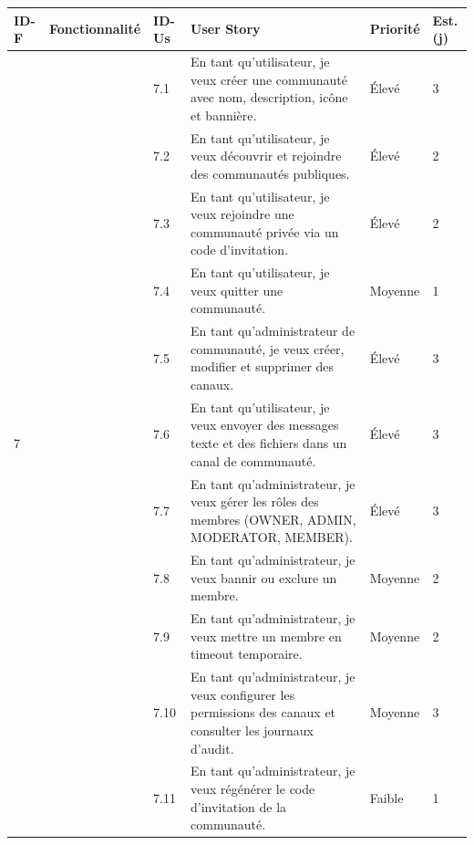 \documentclass[12pt,a4paper]{report}
\begin{document}
\begin{center}
\renewcommand{\arraystretch}{1.4}
\begin{longtable}{|p{1cm}|p{3.2cm}|p{1.2cm}|p{7.2cm}|p{1.8cm}|p{1.8cm}|}
\hline
{}
\color{white}\textbf{ID-F} & \color{white}\textbf{Fonctionnalité} & \color{white}\textbf{ID-Us} & \color{white}\textbf{User Story} & \color{white}\textbf{Priorité} & \color{white}\textbf{Est. (j)} \\
\hline
{} & 
  & 7.1 & En tant qu'utilisateur, je veux créer une communauté avec nom, description, icône et bannière. & Élevé & 3 \\ 
  & & 7.2 & En tant qu'utilisateur, je veux découvrir et rejoindre des communautés publiques. & Élevé & 2 \\ 
  & & 7.3 & En tant qu'utilisateur, je veux rejoindre une communauté privée via un code d'invitation. & Élevé & 2 \\ 
  & & 7.4 & En tant qu'utilisateur, je veux quitter une communauté. & Moyenne & 1 \\ 
  & & 7.5 & En tant qu'administrateur de communauté, je veux créer, modifier et supprimer des canaux. & Élevé & 3 \\ 
  & & 7.6 & En tant qu'utilisateur, je veux envoyer des messages texte et des fichiers dans un canal de communauté. & Élevé & 3 \\ 
  & & 7.7 & En tant qu'administrateur, je veux gérer les rôles des membres (OWNER, ADMIN, MODERATOR, MEMBER). & Élevé & 3 \\ 
  & & 7.8 & En tant qu'administrateur, je veux bannir ou exclure un membre. & Moyenne & 2 \\ 
  & & 7.9 & En tant qu'administrateur, je veux mettre un membre en timeout temporaire. & Moyenne & 2 \\ 
  & & 7.10 & En tant qu'administrateur, je veux configurer les permissions des canaux et consulter les journaux d'audit. & Moyenne & 3 \\ 
  & & 7.11 & En tant qu'administrateur, je veux régénérer le code d'invitation de la communauté. & Faible & 1 \\
\hline
\end{longtable}
\end{center}
\end{document}
